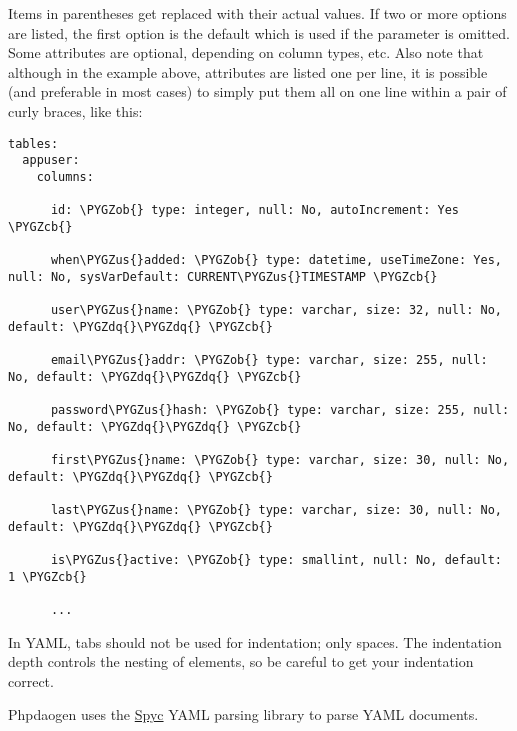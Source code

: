 \documentclass[letterpaper,10pt,english]{sphinxmanual}
\def\PYGZus{\char`\_}
\def\PYGZob{\char`\{}
\def\PYGZcb{\char`\}}
\def\PYGZdq{\char`\"}
\begin{document}
Items in parentheses get replaced with their actual values.  If two or more options are listed, the
first option is the default which is used if the parameter is omitted.  Some attributes are
optional, depending on column types, etc.  Also note that although in the example above, attributes
are listed one per line, it is possible (and preferable in most cases) to simply put them all on one
line within a pair of curly braces, like this:

\begin{Verbatim}[commandchars=\\\{\}]
tables:
  appuser:
    columns:

      id: \PYGZob{} type: integer, null: No, autoIncrement: Yes \PYGZcb{}

      when\PYGZus{}added: \PYGZob{} type: datetime, useTimeZone: Yes, null: No, sysVarDefault: CURRENT\PYGZus{}TIMESTAMP \PYGZcb{}

      user\PYGZus{}name: \PYGZob{} type: varchar, size: 32, null: No, default: \PYGZdq{}\PYGZdq{} \PYGZcb{}

      email\PYGZus{}addr: \PYGZob{} type: varchar, size: 255, null: No, default: \PYGZdq{}\PYGZdq{} \PYGZcb{}

      password\PYGZus{}hash: \PYGZob{} type: varchar, size: 255, null: No, default: \PYGZdq{}\PYGZdq{} \PYGZcb{}

      first\PYGZus{}name: \PYGZob{} type: varchar, size: 30, null: No, default: \PYGZdq{}\PYGZdq{} \PYGZcb{}

      last\PYGZus{}name: \PYGZob{} type: varchar, size: 30, null: No, default: \PYGZdq{}\PYGZdq{} \PYGZcb{}

      is\PYGZus{}active: \PYGZob{} type: smallint, null: No, default: 1 \PYGZcb{}

      ...
\end{Verbatim}

In YAML, tabs should not be used for indentation; only spaces.  The indentation depth controls the
nesting of elements, so be careful to get your indentation correct.

Phpdaogen uses the \href{http://code.google.com/p/spyc/}{Spyc} YAML parsing library to parse YAML
documents.
\end{document}
